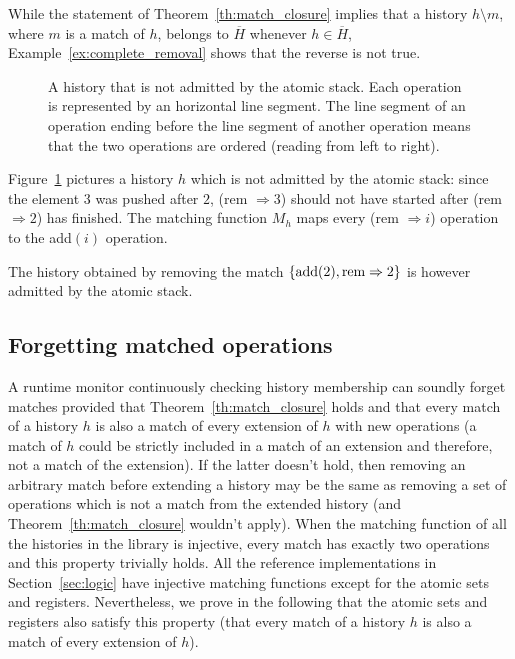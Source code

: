 While the statement of Theorem~\ref{th:match_closure} implies that a history
$h\setminus m$, where $m$ is a match of $h$, belongs to $\overline{H}$ whenever
$h\in \overline{H}$, Example~\ref{ex:complete_removal} shows that the reverse
is not true.

\begin{figure}

  

  \caption{A history that is not admitted by the atomic stack. Each operation
  is represented by an horizontal line segment. The line segment of an
  operation ending before the line segment of another operation means that the
  two operations are ordered (reading from left to right).}
  \label{fig:complete_removal}

\end{figure}

\begin{example}
  \label{ex:complete_removal}

  Figure~\ref{fig:complete_removal} pictures a history $h$ which is not admitted by
  the atomic stack: since the element $3$ was pushed after $2$, (\textnormal{rem} $\Rightarrow
  3$) should not have started after (\textnormal{rem} $\Rightarrow 2$) has finished. The
  matching function $M_h$ maps every (\textnormal{rem} $\Rightarrow i$) operation to the
  \textnormal{add}$(i)$ operation.

  The history obtained by removing the match ${\{  \textnormal{add}(2),
  \textnormal{rem}\Rightarrow 2  \}}$ is however admitted by the atomic stack.

\end{example}

\subsection{Forgetting matched operations}

A runtime monitor continuously checking history membership can soundly forget
matches provided that Theorem~\ref{th:match_closure} holds and that every match of a history $h$ is also a match of 
every extension of $h$ with new operations (a match of $h$
could be strictly included in a match of an extension and therefore, not a
match of the extension). If the latter doesn't hold, then removing an arbitrary match before
extending a history may be the same as removing a set of operations which is
not a match from the extended history (and
Theorem~\ref{th:match_closure} wouldn't apply). When the
matching function of all the histories in the library is injective, every
match has exactly two operations and this property trivially holds. All the 
reference implementations in
Section~\ref{sec:logic} have injective matching functions except for the atomic sets and
registers. Nevertheless, we prove in the following that the atomic sets and registers also 
satisfy this property (that every match of a history $h$ is also a match of 
every extension of $h$).

